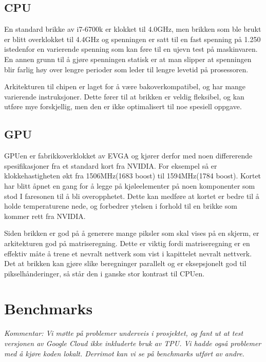 \subsection{CPU}
En standard brikke av i7-6700k er klokket til 4.0GHz, men brikken som ble brukt er blitt overklokket til 4.4GHz og spenningen er satt til en fast spenning på 1.250 istedenfor en varierende spenning som kan føre til en ujevn test på maskinvaren. En annen grunn til å gjøre spenningen statisk er at man slipper at spenningen blir farlig høy over lengre perioder som leder til lengre levetid på prosessoren.

Arkitekturen til chipen er laget for å være bakoverkompatibel, og har mange varierende instruksjoner. Dette fører til at brikken er veldig fleksibel, og kan utføre mye forskjellig, men den er ikke optimalisert til noe spesiell oppgave.

\subsection{GPU}
GPUen er fabrikkoverklokket av EVGA og kjører derfor med noen differerende spesifikasjoner fra et standard kort fra NVIDIA. For eksempel så er klokkehastigheten økt fra 1506MHz(1683 boost) til 1594MHz(1784 boost). Kortet har blitt åpnet en gang for å legge på kjøleelementer på noen komponenter som stod I faresonen til å bli overopphetet. Dette kan medføre at kortet er bedre til å holde temperaturene nede, og forbedrer ytelsen i forhold til en brikke som kommer rett fra NVIDIA.

Siden brikken er god på å generere mange piksler som skal vises på en skjerm, er arkitekturen god på matriseregning. Dette er viktig fordi matriseregning er en effektiv måte å trene et nevralt nettverk som vist i kapittelet nevralt nettverk. Det at brikken kan gjøre slike beregninger parallelt og er eksepsjonelt god til pikselhånderinger, så står den i ganske stor kontrast til CPUen.

\newpage
\section{Benchmarks}
\textit{Kommentar: Vi møtte på problemer underveis i prosjektet, og fant ut at test versjonen av Google Cloud ikke inkluderte bruk av TPU.  Vi hadde også problemer med å kjøre koden lokalt. Derrimot kan vi se på benchmarks utført av andre.}

